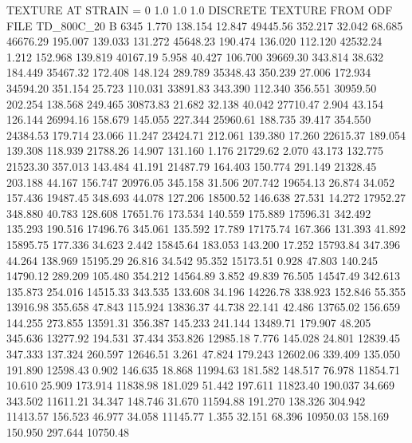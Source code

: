 TEXTURE AT STRAIN = 0
1.0   1.0   1.0
DISCRETE TEXTURE FROM ODF FILE TD_800C_20
B 6345
   1.770  138.154   12.847     49445.56
 352.217   32.042   68.685     46676.29
 195.007  139.033  131.272     45648.23
 190.474  136.020  112.120     42532.24
   1.212  152.968  139.819     40167.19
   5.958   40.427  106.700     39669.30
 343.814   38.632  184.449     35467.32
 172.408  148.124  289.789     35348.43
 350.239   27.006  172.934     34594.20
 351.154   25.723  110.031     33891.83
 343.390  112.340  356.551     30959.50
 202.254  138.568  249.465     30873.83
  21.682   32.138   40.042     27710.47
   2.904   43.154  126.144     26994.16
 158.679  145.055  227.344     25960.61
 188.735   39.417  354.550     24384.53
 179.714   23.066   11.247     23424.71
 212.061  139.380   17.260     22615.37
 189.054  139.308  118.939     21788.26
  14.907  131.160    1.176     21729.62
   2.070   43.173  132.775     21523.30
 357.013  143.484   41.191     21487.79
 164.403  150.774  291.149     21328.45
 203.188   44.167  156.747     20976.05
 345.158   31.506  207.742     19654.13
  26.874   34.052  157.436     19487.45
 348.693   44.078  127.206     18500.52
 146.638   27.531   14.272     17952.27
 348.880   40.783  128.608     17651.76
 173.534  140.559  175.889     17596.31
 342.492  135.293  190.516     17496.76
 345.061  135.592   17.789     17175.74
 167.366  131.393   41.892     15895.75
 177.336   34.623    2.442     15845.64
 183.053  143.200   17.252     15793.84
 347.396   44.264  138.969     15195.29
  26.816   34.542   95.352     15173.51
   0.928   47.803  140.245     14790.12
 289.209  105.480  354.212     14564.89
   3.852   49.839   76.505     14547.49
 342.613  135.873  254.016     14515.33
 343.535  133.608   34.196     14226.78
 338.923  152.846   55.355     13916.98
 355.658   47.843  115.924     13836.37
  44.738   22.141   42.486     13765.02
 156.659  144.255  273.855     13591.31
 356.387  145.233  241.144     13489.71
 179.907   48.205  345.636     13277.92
 194.531   37.434  353.826     12985.18
   7.776  145.028   24.801     12839.45
 347.333  137.324  260.597     12646.51
   3.261   47.824  179.243     12602.06
 339.409  135.050  191.890     12598.43
   0.902  146.635   18.868     11994.63
 181.582  148.517   76.978     11854.71
  10.610   25.909  173.914     11838.98
 181.029   51.442  197.611     11823.40
 190.037   34.669  343.502     11611.21
  34.347  148.746   31.670     11594.88
 191.270  138.326  304.942     11413.57
 156.523   46.977   34.058     11145.77
   1.355   32.151   68.396     10950.03
 158.169  150.950  297.644     10750.48
